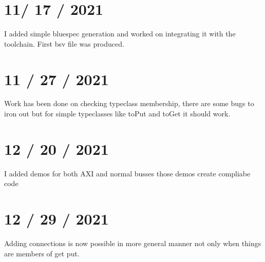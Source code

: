 \documentclass{article}
\begin{document}
\section{11/ 17 / 2021}
    I added simple bluespec generation and worked on integrating it with the toolchain. First bsv file was produced.

\section{11 / 27 / 2021}
    Work has been done on checking typeclass membership, there are some bugs to iron out but for simple typeclasses like toPut and toGet it should work.

\section{12 / 20 / 2021}
    I added demos for both AXI and normal busses those demos create compliabe code
\section{12 / 29 / 2021}
    Adding connections is now possible in more general manner not only when things are members of get put. 


    
\end{document}
